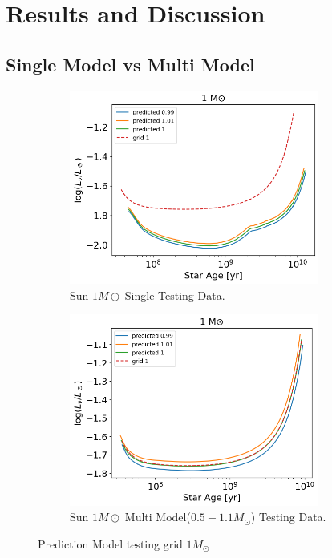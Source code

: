 \section{Results and Discussion}

\subsection{Single Model vs Multi Model}
\begin{figure}[H]
	\centering
	\begin{subfigure}{\textwidth}
		\includegraphics[width=0.9\textwidth,height=0.5\textheight]{assets/output1singlemodel.png}
		\caption{Sun $1M\odot$ Single Testing Data.}
		\label{fig:SunTesta}	
	\end{subfigure}
	\begin{subfigure}{\textwidth}
		\includegraphics[width=0.9\textwidth,height=0.5\textheight]{assets/output1.png}
		\caption{Sun $1M\odot$ Multi Model($0.5-1.1M_\odot$) Testing Data.}
		\label{fig:SunTestb}	
	\end{subfigure}
	\caption{Prediction Model testing grid $1M_\odot$}
	\label{fig:SunTest}
\end{figure}


